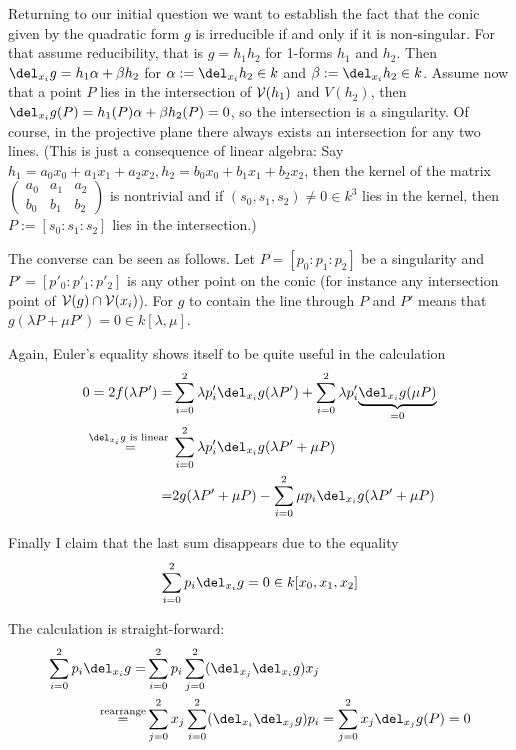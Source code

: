 Returning to our initial question we want to establish the fact that the conic given by the quadratic form $g$ is irreducible if and only if it is non-singular.
For that assume reducibility, that is $g = h_1h_2$ for 1-forms $h_1$ and $h_2$.
Then $\del_{x_i}g = h_1\alpha + \beta h_2$ for $\alpha := \del_{x_i}h_2 \in k$ and $\beta := \del_{x_i}h_2 \in k$.
Assume now that a point $P$ lies in the intersection of $\operatorname{\mathcal V}(h_1)$ and $V(h_2)$, then $\del_{x_i}g(P) = h_1(P)\alpha + \beta h_2(P) = 0$, so the intersection is a singularity.
Of course, in the projective plane there always exists an intersection for any two lines.
(This is just a consequence of linear algebra: Say $h_1 = a_0x_0 + a_1x_1 + a_2x_2, h_2 = b_0x_0 + b_1x_1 + b_2x_2$, then the kernel of the matrix $\begin{pmatrix} a_0 & a_1 & a_2 \\ b_0 & b_1 & b_2 \end{pmatrix}$ is nontrivial and if $(s_0,s_1,s_2) \neq 0 \in k^3$ lies in the kernel, then $P := [s_0:s_1:s_2]$ lies in the intersection.)

The converse can be seen as follows. Let $P=[p_0:p_1:p_2]$ be a singularity and $P'=[p'_0:p'_1:p'_2]$ is any other point on the conic (for instance any intersection point of $\operatorname{\mathcal V}(g) \cap \operatorname{\mathcal V}(x_i)$).
For $g$ to contain the line through $P$ and $P'$ means that $g(\lambda P + \mu P') = 0 \in k[\lambda,\mu]$.

Again, Euler's equality shows itself to be quite useful in the calculation
\begin{align}
0
= 2f(\lambda P')
=& \sum_{i=0}^2 \lambda p'_i \del_{x_i}g(\lambda P') 
+ \sum_{i=0}^2 \lambda p'_i \underset{=0}{\underbrace{\del_{x_i}g(\mu P)}}
\\
\overset{\del_{x_i}g\text{ is linear }}=& \sum_{i=0}^2 \lambda p'_i \del_{x_i} g(\lambda P'+\mu P) 
\\
=& 2g(\lambda P' + \mu P) - \sum_{i=0}^2 \mu p_i \del_{x_i}g(\lambda P' + \mu P)
\end{align}

Finally I claim that the last sum disappears due to the equality
\begin{equation}
\sum_{i=0}^2 p_i \del_{x_i}g = 0 \in k[x_0,x_1,x_2]
\end{equation}

The calculation is straight-forward:
\begin{align}
\sum_{i=0}^2 p_i \del_{x_i} g
=& \sum_{i=0}^2 p_i \sum_{j=0}^2 (\del_{x_j}\del_{x_i}g)x_j
\\
\overset{\text{rearrange}}=& \sum_{j=0}^2 x_j \sum_{i=0}^2 (\del_{x_i}\del_{x_j}g)p_i = \sum_{j=0}^2 x_j \del_{x_j}g(P) = 0
\end{align}


